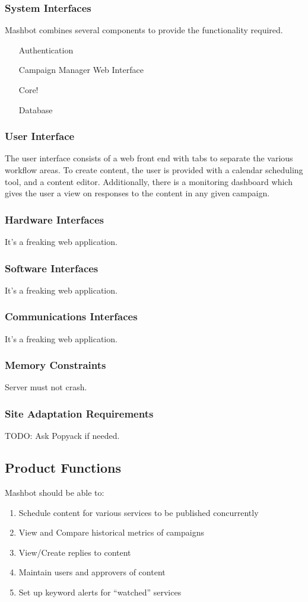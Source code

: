 \documentclass{article}
\begin{document}
		\subsubsection{System Interfaces}
			Mashbot combines several components to provide the functionality
			required.
			\begin{itemize}
				\item[Authentication]
				\item[Campaign Manager Web Interface]
				\item[Core!]
				\item[Database]
			\end{itemize}
		\subsubsection{User Interface}
                The user interface consists of a web front end
                with tabs to separate the various workflow areas. To
                create content, the user is provided with a calendar
                scheduling tool, and a content editor.  Additionally,
                there is a monitoring dashboard which gives the user a
                view on responses to the content in any given campaign.
		\subsubsection{Hardware Interfaces}
                It's a freaking web application.
		\subsubsection{Software Interfaces}
                It's a freaking web application.
		\subsubsection{Communications Interfaces}
                It's a freaking web application.
		\subsubsection{Memory Constraints}
                Server must not crash.
		\subsubsection{Site Adaptation Requirements}
                TODO: Ask Popyack if needed.
	\subsection{Product Functions}
        Mashbot should be able to:
        \begin{enumerate}
          \item Schedule content for various services to be
            published concurrently
          \item View and Compare historical metrics of campaigns
          \item View/Create replies to content
          \item Maintain users and approvers of content
          \item Set up keyword alerts for ``watched'' services
        \end{enumerate}
\end{document}
